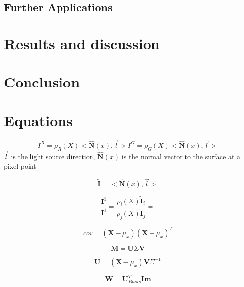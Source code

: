 \documentclass{article}\twocolumn
\begin{document}

\subsection{Further Applications}


\section{Results and discussion}

\section{Conclusion}


\section{Equations} 
\begin{equation}
    I^{R} = \rho _{R}(X)<\hat{\mathbf{N}}(x),\vec{l}>
    I^{G} = \rho _{G}(X)<\hat{\mathbf{N}}(x),\vec{l}>
\end{equation}
$\vec{l}$ is the light source direction, $\hat{\mathbf{N}}(x)$ is the normal vector to the surface at a pixel point

\begin{equation}
    \tilde{\mathbf{I}} = <\hat{\mathbf{N}}(x),\vec{l}>
\end{equation}

\begin{equation}
    \frac{\mathbf{I^{i}}}{\mathbf{I^{j}}} = \frac{\rho _{i}(X)\tilde{\mathbf{I}}_{i}}{\rho _{j}(X)\tilde{\mathbf{I}}_{j}} = 
\end{equation}

\begin{equation}
    cov = (\textbf{X} - \mu_{x})(\textbf{X} - \mu_{x})^{T}
\end{equation}

\begin{equation}
    \textbf{M} = \textbf{U} \textbf{$\Sigma$} \textbf{V}
\end{equation}

\begin{equation}
    \textbf{U} = (\textbf{X} - \mu_{x}) \textbf{V} \Sigma^{-1}
\end{equation}

\begin{equation}
    \textbf{W} = \textbf{U}_{Basis}^{T} \textbf{Im}
\end{equation}




\end{document}
